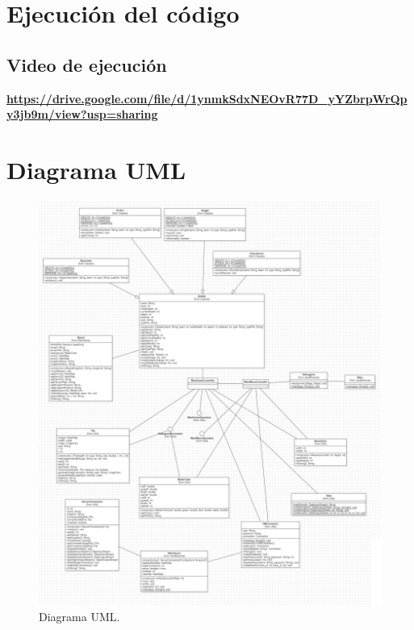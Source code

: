 \documentclass{article}
\begin{document}
\section{Ejecución del código}
\subsection{Video de ejecución}
\bf{\url{https://drive.google.com/file/d/1ynmkSdxNEOvR77D_yYZbrpWrQpy3jb9m/view?usp=sharing}}
\pagebreak

\section{Diagrama UML}
\begin{figure}[H]
	\centering
	\includegraphics[width=1\textwidth,keepaspectratio]{img/uml.png}
	\caption{Diagrama UML.}
\end{figure}
\pagebreak
\end{document}
